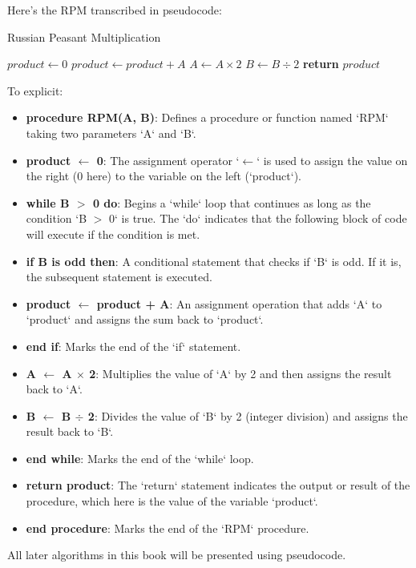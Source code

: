 Here's the RPM transcribed in pseudocode:
\begin{algorithm}[H]
	\caption{Russian Peasant Multiplication}\label{alg:rpm}
	\begin{algorithmic}[1]
		\State $product \gets 0$
				\State $product \gets product + A$
			\EndIf
			\State $A \gets A \times 2$
			\State $B \gets B \div 2$
		\EndWhile
		\State \textbf{return} $product$
	\EndProcedure
	\end{algorithmic}
	\end{algorithm}

    To explicit:
    \begin{itemize}
        \item \textbf{procedure RPM(A, B)}: Defines a procedure or function named `RPM` taking two parameters `A` and `B`.
        \item \textbf{product $\leftarrow$ 0}: The assignment operator `$\leftarrow$` is used to assign the value on the right (0 here) to the variable on the left (`product`).
        \item \textbf{while B $>$ 0 do}: Begins a `while` loop that continues as long as the condition `B $>$ 0` is true. The `do` indicates that the following block of code will execute if the condition is met.
        \item \textbf{if B is odd then}: A conditional statement that checks if `B` is odd. If it is, the subsequent statement is executed.
        \item \textbf{product $\leftarrow$ product + A}: An assignment operation that adds `A` to `product` and assigns the sum back to `product`.
        \item \textbf{end if}: Marks the end of the `if` statement.
        \item \textbf{A $\leftarrow$ A $\times$ 2}: Multiplies the value of `A` by 2 and then assigns the result back to `A`.
        \item \textbf{B $\leftarrow$ B $\div$ 2}: Divides the value of `B` by 2 (integer division) and assigns the result back to `B`.
        \item \textbf{end while}: Marks the end of the `while` loop.
        \item \textbf{return product}: The `return` statement indicates the output or result of the procedure, which here is the value of the variable `product`.
        \item \textbf{end procedure}: Marks the end of the `RPM` procedure.
    \end{itemize}
	All later algorithms in this book will be presented using pseudocode.

